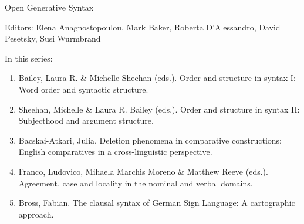 {\large Open Generative Syntax}

\bigskip

Editors:   Elena Anagnostopoulou,
    Mark Baker,
    Roberta D’Alessandro,
    David Pesetsky,
    Susi Wurmbrand


\bigskip

In this series:

\begin{enumerate}
\item Bailey, Laura R. \& Michelle Sheehan (eds.). Order and structure in syntax I: Word order and syntactic structure.
\item Sheehan, Michelle \& Laura R. Bailey (eds.).  Order and structure in syntax II: Subjecthood and argument structure.
\item Bacskai-Atkari, Julia. Deletion phenomena in comparative constructions: English comparatives in a cross-linguistic perspective.
\item Franco, Ludovico, Mihaela Marchis Moreno \& Matthew Reeve (eds.). Agreement, case and locality in the nominal and verbal domains.
\item Bross, Fabian. The clausal syntax of German Sign Language: A cartographic
approach.
\end{enumerate}



\vfill



